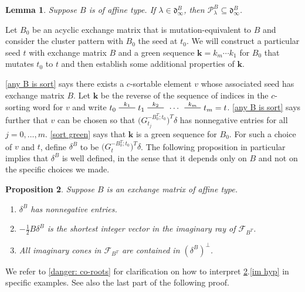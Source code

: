 \documentclass{amsart}
\newtheorem{proposition}{Proposition}[section]
\newtheorem{lemma}[proposition]{Lemma}
\theoremstyle{definition}
\theoremstyle{remark}
\numberwithin{equation}{section}
\newcommand{\edge}{\,\,\rule[2.7pt]{20pt}{0.5pt}\,\,}
\newcommand{\F}{{\mathcal F}}
\newcommand{\0}{{\mathbf{0}}}
\newcommand{\kk}{{\boldsymbol{k}}}
\renewcommand{\P}{\mathcal{P}}
\renewcommand{\d}{{\mathfrak d}}
\begin{document}
\begin{lemma}\label{P in dBinf}
Suppose $B$ is of affine type.
If $\lambda\in\d^B_\infty$, then $\P^B_\lambda\subseteq\d^B_\infty$.
\end{lemma}

Let $B_0$ be an acyclic exchange matrix that is mutation-equivalent to $B$ and consider the cluster pattern with $B_0$ the seed at $t_0$.
We will construct a particular seed $t$ with exchange matrix $B$ and a green sequence $\kk=k_m\cdots k_1$ for $B_0$ that mutates $t_0$ to $t$ and then establish some additional properties of $\kk$.

\cref{any B is sort} says there exists a $c$-sortable element $v$ whose associated seed has exchange matrix $B$.
Let $\kk$ be the reverse of the sequence of indices in the $c$-sorting word for $v$ and write $t_0\overset{k_1}{\edge}t_1\overset{k_2}{\edge}\,\cdots\,\overset{k_m}{\edge}t_m=t$.
\cref{any B is sort} says further that $v$ can be chosen so that $\bigl(G_{t_j}^{-B_0^T;t_0}\bigr)^T\delta$ has nonnegative entries for all $j=0,\ldots,m$.
\cref{sort green} says that $\kk$ is a green sequence for $B_0$.
For such a choice of $v$ and $t$, define $\delta^B$ to be $\bigl(G_t^{-B_0^T;t_0}\bigr)^T\delta$.  The following proposition in particular implies that $\delta^B$ is well defined, in the sense that it depends only on $B$ and not on the specific choices we made.


\begin{proposition}\label{delta is the man}
Suppose $B$ is an exchange matrix of affine type.
\begin{enumerate}[\quad\bf1.]
\item \label{im ray pos}
$\delta^B$ has nonnegative entries.
\item \label{im ray}
$-\frac12B\delta^B$ is the shortest integer vector in the imaginary ray of $\F_{B^T}$.
\item \label{im hyp}
All imaginary cones in $\F_{B^T}$ are contained in $(\delta^B)^\perp$.
\end{enumerate}
\end{proposition}

We refer to \cref{danger: co-roots} for clarification on how to interpret \cref{delta is the man}.\ref{im hyp} in specific examples.
See also the last part of the following proof.
\end{document}
